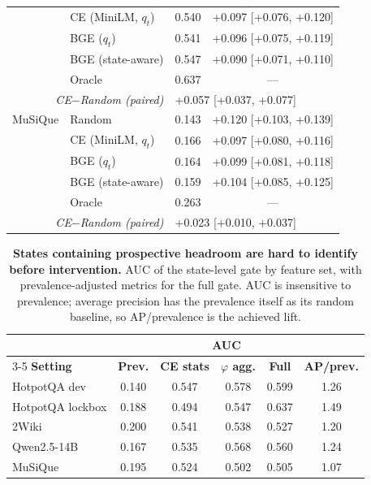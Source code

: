 \begin{table}[t]
\begin{tabular}{llcc}
 & CE (MiniLM, $q_t$) & 0.540 & +0.097 [+0.076, +0.120] \\
 & BGE ($q_t$) & 0.541 & +0.096 [+0.075, +0.119] \\
 & BGE (state-aware) & 0.547 & +0.090 [+0.071, +0.110] \\
 & Oracle & 0.637 & --- \\
\multicolumn{2}{r}{\emph{CE$-$Random (paired)}} & \multicolumn{2}{l}{+0.057 [+0.037, +0.077]} \\
\midrule
MuSiQue & Random & 0.143 & +0.120 [+0.103, +0.139] \\
 & CE (MiniLM, $q_t$) & 0.166 & +0.097 [+0.080, +0.116] \\
 & BGE ($q_t$) & 0.164 & +0.099 [+0.081, +0.118] \\
 & BGE (state-aware) & 0.159 & +0.104 [+0.085, +0.125] \\
 & Oracle & 0.263 & --- \\
\multicolumn{2}{r}{\emph{CE$-$Random (paired)}} & \multicolumn{2}{l}{+0.023 [+0.010, +0.037]} \\
\bottomrule
\end{tabular}
\end{table}

\begin{table}[t]
\centering
\small
\caption{\textbf{States containing prospective headroom are hard to
identify before intervention.} AUC of the state-level gate by feature
set, with prevalence-adjusted metrics for the full gate. AUC is
insensitive to prevalence; average precision has the prevalence itself
as its random baseline, so AP/prevalence is the achieved lift.}
\label{tab:gate}
\begin{tabular}{lccccc}
\toprule
& & \multicolumn{3}{c}{\textbf{AUC}} & \\
\cmidrule(lr){3-5}
\textbf{Setting} & \textbf{Prev.} & \textbf{CE stats} & \textbf{$\varphi$ agg.} & \textbf{Full} & \textbf{AP/prev.} \\
\midrule
HotpotQA dev & 0.140 & 0.547 & 0.578 & 0.599 & 1.26 \\
HotpotQA lockbox & 0.188 & 0.494 & 0.547 & 0.637 & 1.49 \\
2Wiki & 0.200 & 0.541 & 0.538 & 0.527 & 1.20 \\
Qwen2.5-14B & 0.167 & 0.535 & 0.568 & 0.560 & 1.24 \\
MuSiQue & 0.195 & 0.524 & 0.502 & 0.505 & 1.07 \\
\bottomrule
\end{tabular}
\end{table}

